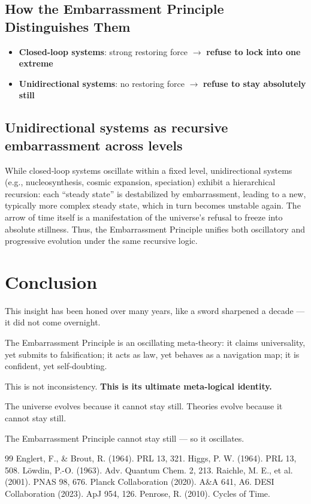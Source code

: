 \documentclass[10pt,a4paper]{article}
\begin{document}
\subsection{How the Embarrassment Principle Distinguishes Them}
\begin{itemize}[noitemsep]
\item \textbf{Closed-loop systems}: strong restoring force $\to$ \textbf{refuse to lock into one extreme}
\item \textbf{Unidirectional systems}: no restoring force $\to$ \textbf{refuse to stay absolutely still}
\end{itemize}

\subsection{Unidirectional systems as recursive embarrassment across levels}
While closed‑loop systems oscillate within a fixed level, unidirectional systems (e.g., nucleosynthesis, cosmic expansion, speciation) exhibit a hierarchical recursion: each “steady state” is destabilized by embarrassment, leading to a new, typically more complex steady state, which in turn becomes unstable again. The arrow of time itself is a manifestation of the universe’s refusal to freeze into absolute stillness. Thus, the Embarrassment Principle unifies both oscillatory and progressive evolution under the same recursive logic.

\section*{Conclusion}
This insight has been honed over many years, like a sword sharpened a decade --- it did not come overnight.

The Embarrassment Principle is an oscillating meta-theory:
it claims universality, yet submits to falsification;
it acts as law, yet behaves as a navigation map;
it is confident, yet self-doubting.

This is not inconsistency.
\textbf{This is its ultimate meta-logical identity.}

The universe evolves because it cannot stay still.
Theories evolve because it cannot stay still.

The Embarrassment Principle cannot stay still --- so it oscillates.

\begin{thebibliography}{99}
 Englert, F., \& Brout, R. (1964). PRL 13, 321.
 Higgs, P. W. (1964). PRL 13, 508.
 Löwdin, P.-O. (1963). Adv. Quantum Chem. 2, 213.
 Raichle, M. E., et al. (2001). PNAS 98, 676.
 Planck Collaboration (2020). A\&A 641, A6.
 DESI Collaboration (2023). ApJ 954, 126.
 Penrose, R. (2010). Cycles of Time.
\end{thebibliography}
\end{document}
